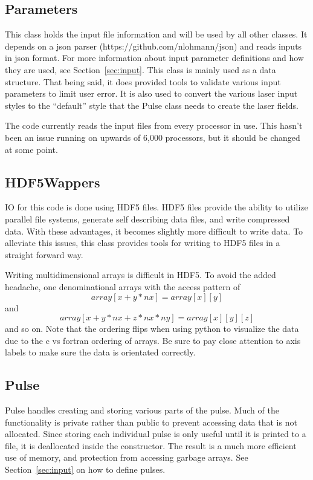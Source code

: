 \documentclass{article}
\begin{document}
\subsection{Parameters} %
\label{sub:parameters}
This class holds the input file information and will be used by all other classes. It depends on a json parser (https://github.com/nlohmann/json) and reads inputs in json format. For more information about input parameter definitions and how they are used, see Section~\ref{sec:input}. This class is mainly used as a data structure. That being said, it does provided tools to validate various input parameters to limit user error. It is also used to convert the various laser input styles to the ``default'' style that the Pulse class needs to create the laser fields.

The code currently reads the input files from every processor in use. This hasn't been an issue running on upwards of 6,000 processors, but it should be changed at some point.


\subsection{HDF5Wappers} %
\label{sub:hdf5wappers}
IO for this code is done using HDF5 files. HDF5 files provide the ability to utilize parallel file systems, generate self describing data files, and write compressed data. With these advantages, it becomes slightly more difficult to write data. To alleviate this issues, this class provides tools for writing to HDF5 files in a straight forward way.

Writing multidimensional arrays is difficult in HDF5. To avoid the added headache, one denominational arrays with the access pattern of
\begin{equation}
	array[x+y*nx] = array[x][y]
\end{equation}
and
\begin{equation}
	array[x+y*nx+z*nx*ny] = array[x][y][z]
\end{equation}
and so on. Note that the ordering flips when using python to visualize the data due to the c vs fortran ordering of arrays. Be sure to pay close attention to axis labels to make sure the data is orientated correctly.

\subsection{Pulse} %
\label{sub:pulse}
Pulse handles creating and storing various parts of the pulse. Much of the functionality is private rather than public to prevent accessing data that is not allocated. Since storing each individual pulse is only useful until it is printed to a file, it is deallocated inside the constructor. The result is a much more efficient use of memory, and protection from accessing garbage arrays. See Section~\ref{sec:input} on how to define pulses.
\end{document}
